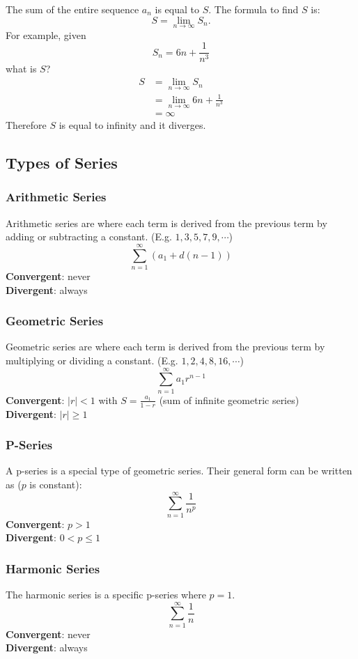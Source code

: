 \documentclass[12pt]{article}
\begin{document}
The sum of the entire sequence $a_n$ is equal to $S$. The formula to find $S$ is:
\[ S = \lim_{n \to \infty} S_n. \]
For example, given
\[ S_n = 6n + \frac{1}{n^3} \]
what is $S$?
\begin{align*}
	S & = \lim_{n \to \infty} S_n                \\
	& = \lim_{n \to \infty} 6n + \frac{1}{n^3} \\[6pt]
	& = \infty
\end{align*}
Therefore $S$ is equal to infinity and it diverges.

\subsection{Types of Series}
\subsubsection{Arithmetic Series}
Arithmetic series are where each term is derived from the previous term by adding or subtracting a constant. (E.g. $1, 3, 5, 7, 9, \cdots$)
\[ \sum_{n=1}^\infty (a_1 + d(n-1)) \]
\textbf{Convergent}: never
\\ \textbf{Divergent}: always

\subsubsection{Geometric Series}
Geometric series are where each term is derived from the previous term by multiplying or dividing a constant. (E.g. $1, 2, 4, 8, 16, \cdots$)
\[ \sum_{n=1}^\infty a_1r^{n-1} \]
\textbf{Convergent}: $|r| < 1$ with $S = \frac{a_1}{1-r}$ (sum of infinite geometric series)
\\ \textbf{Divergent}: $|r| \ge 1$

\subsubsection{P-Series}
A p-series is a special type of geometric series. Their general form can be written as ($p$ is constant):
\[ \sum_{n=1}^\infty \frac{1}{n^p} \]
\textbf{Convergent}: $p > 1$
\\ \textbf{Divergent}: $0 < p \le 1$

\subsubsection{Harmonic Series}
The harmonic series is a specific p-series where $p=1$.
\[ \sum_{n=1}^\infty \frac{1}{n} \]
\textbf{Convergent}: never
\\ \textbf{Divergent}: always
\end{document}
